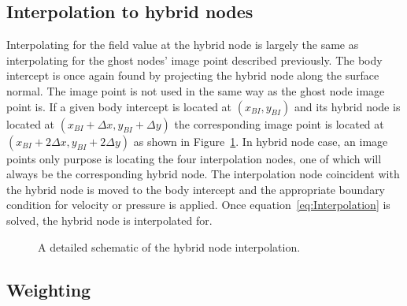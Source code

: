 \subsection{Interpolation to hybrid nodes}
\label{Sec:Interpolation}

Interpolating for the field value at the hybrid node is largely the same as interpolating for the ghost nodes' image point described previously. 
The body intercept is once again found by projecting the hybrid node along the surface normal. 
The image point is not used in the same way as the ghost node image point is. 
If a given body intercept is located at $(x_{BI},y_{BI})$ and its hybrid node is located at $(x_{BI}+\Delta x,y_{BI}+\Delta y)$ the corresponding image point is located at $(x_{BI}+2\Delta x,y_{BI}+2\Delta y)$ as shown in Figure~\ref{fig:Interpolate}. 
In hybrid node case, an image points only purpose is locating the four interpolation nodes, one of which will always be the corresponding hybrid node. 
The interpolation node coincident with the hybrid node is moved to the body intercept and the appropriate boundary condition for velocity or pressure is applied.
Once equation~\eqref{eq:Interpolation} is solved, the hybrid node is interpolated for.

\begin{figure}[!htb]
	\centering
	
	\caption{A detailed schematic of the hybrid node interpolation.}
	\label{fig:Interpolate}
\end{figure}

\subsection{Weighting}
\label{Sec:Weighting}

